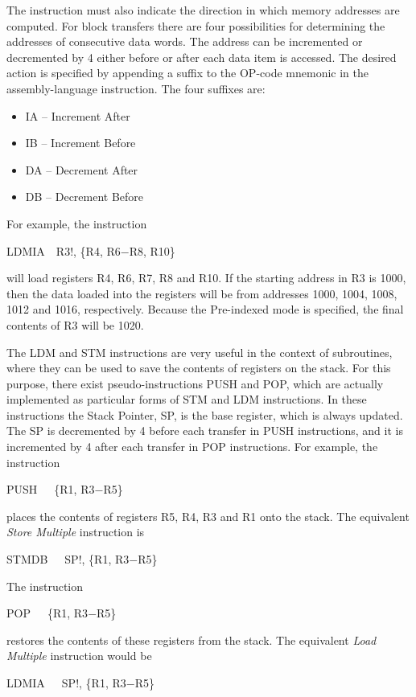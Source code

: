 \documentclass[11pt, twoside, pdftex]{article}
\begin{document}
The instruction must also indicate the direction in which
memory addresses are computed. For block transfers there are four
possibilities for determining the addresses of consecutive data
words. The address can be incremented or decremented by 4 either before or after each 
data item is accessed. The desired action
is specified by appending a suffix to the OP-code mnemonic in the 
assembly-language instruction. The four suffixes are:
\begin{itemize}
\item IA -- Increment After
\item IB -- Increment Before
\item DA -- Decrement After
\item DB -- Decrement Before
\end{itemize}
\noindent
For example, the instruction
\begin{center}
LDMIA~~R3!, \{R4, R6$-$R8, R10\}
\end{center}
will load registers R4, R6, R7, R8 and R10. If the starting
address in R3 is 1000, then the data loaded into the registers
will be from addresses 1000, 1004, 1008, 1012 and 1016,
respectively. Because the Pre-indexed mode is specified, the
final contents of R3 will be 1020.

The LDM and STM instructions are very useful in the context of
subroutines, where they can be used to save the contents of
registers on the stack. For this purpose, there exist 
pseudo-instructions PUSH and POP, which are actually implemented 
as particular forms of STM and LDM instructions.
In these instructions the Stack Pointer, SP, is the base
register, which is always updated. The SP is decremented by 4
before each transfer in PUSH instructions, and it is incremented
by 4 after each transfer in POP instructions.
For example, the instruction 
\begin{center}
PUSH~~~\{R1, R3$-$R5\}
\end{center}
\noindent
places the contents of registers R5, R4, R3 and R1 onto the stack.
The equivalent {\it Store Multiple} instruction is
\begin{center}
STMDB~~~SP!, \{R1, R3$-$R5\}
\end{center}
\noindent
The instruction
\begin{center}
POP~~~\{R1, R3$-$R5\}
\end{center}
\noindent
restores the contents of these registers from the stack.
The equivalent {\it Load Multiple} instruction would be
\begin{center}
LDMIA~~~SP!, \{R1, R3$-$R5\}
\end{center}
 
\end{document}
